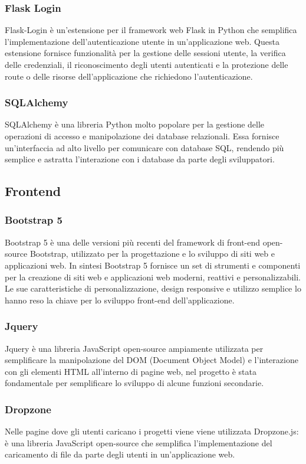 \documentclass{article}
\begin{document}
\subsubsection{Flask Login}
Flask-Login è un'estensione per il framework web Flask in Python che semplifica l'implementazione dell'autenticazione utente in un'applicazione web. Questa estensione fornisce funzionalità per la gestione delle sessioni utente, la verifica delle credenziali, il riconoscimento degli utenti autenticati e la protezione delle route o delle risorse dell'applicazione che richiedono l'autenticazione.
\subsubsection{SQLAlchemy}
SQLAlchemy è una libreria Python molto popolare per la gestione delle operazioni di accesso e manipolazione dei database relazionali. Essa fornisce un'interfaccia ad alto livello per comunicare con database SQL, rendendo più semplice e astratta l'interazione con i database da parte degli sviluppatori.

\subsection{Frontend}
\subsubsection{Bootstrap 5}
Bootstrap 5 è una delle versioni più recenti del framework di front-end open-source Bootstrap, utilizzato per la progettazione e lo sviluppo di siti web e applicazioni web. In sintesi Bootstrap 5 fornisce un set di strumenti e componenti per la creazione di siti web e applicazioni web moderni, reattivi e personalizzabili. Le sue caratteristiche di personalizzazione, design responsive e utilizzo semplice lo hanno reso la chiave per lo sviluppo front-end dell'applicazione.
\subsubsection{Jquery}
Jquery è una libreria JavaScript open-source ampiamente utilizzata per semplificare la manipolazione del DOM (Document Object Model) e l'interazione con gli elementi HTML all'interno di pagine web, nel progetto è stata fondamentale per semplificare lo sviluppo di alcune funzioni secondarie.
\subsubsection{Dropzone}
Nelle pagine dove gli utenti caricano i progetti viene viene utilizzata Dropzone.js: è una libreria JavaScript open-source che semplifica l'implementazione del caricamento di file da parte degli utenti in un'applicazione web.
\end{document}
